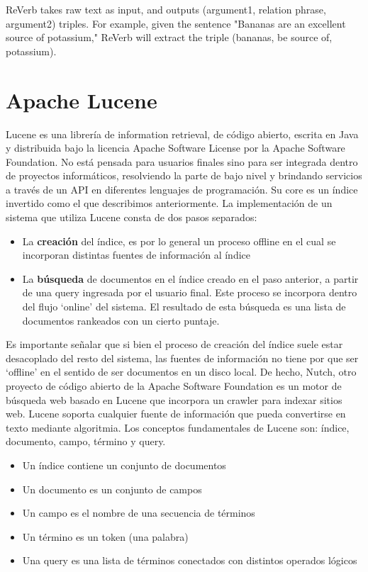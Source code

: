 ReVerb takes raw text as input, and outputs (argument1, relation phrase, argument2) triples. For example, given the sentence "Bananas are an excellent source of potassium," ReVerb will extract the triple (bananas, be source of, potassium).

\section{Apache Lucene}
\label{sec:lucene}
Lucene es una librer\'ia de information retrieval, de c\'odigo abierto, escrita en Java y distribuida 
bajo la licencia Apache Software License por la Apache Software Foundation. No est\'a pensada para
usuarios finales sino para ser integrada dentro de proyectos inform\'aticos, resolviendo
la parte de bajo nivel y brindando servicios a trav\'es de un API en diferentes lenguajes de programaci\'on.
Su core es un \'indice invertido como el que describimos anteriormente. La implementaci\'on de un sistema
que utiliza Lucene consta de dos pasos separados:
\begin{itemize}
\item La \textbf{creaci\'on} del \'indice, es por lo general un proceso offline en el cual 
se incorporan distintas fuentes de informaci\'on al \'indice 
\item La \textbf{b\'usqueda} de documentos en el \'indice creado en el paso anterior, a partir de una query 
ingresada por el usuario final. Este proceso se incorpora dentro del flujo `online' del sistema.
El resultado de esta b\'usqueda es una lista de documentos rankeados con un cierto puntaje. 
\end{itemize}

Es importante señalar que si bien el proceso de creaci\'on del \'indice suele estar desacoplado del resto 
del sistema, las fuentes de informaci\'on no tiene por que ser `offline' en el sentido de ser documentos
en un disco local. De hecho, Nutch, otro proyecto de c\'odigo abierto de la Apache Software Foundation es 
un motor de b\'usqueda web basado en Lucene que incorpora un crawler para indexar sitios web. Lucene soporta 
cualquier fuente de informaci\'on que pueda convertirse en texto mediante algoritmia.
\newline
Los conceptos fundamentales de Lucene son: \'indice, documento, campo, t\'ermino y query.
\begin{itemize}
\item Un \'indice contiene un conjunto de documentos
\item Un documento es un conjunto de campos
\item Un campo es el nombre de una secuencia de t\'erminos
\item Un t\'ermino es un token (una palabra)
\item Una query es una lista de t\'erminos conectados con distintos operados l\'ogicos
\end{itemize}

